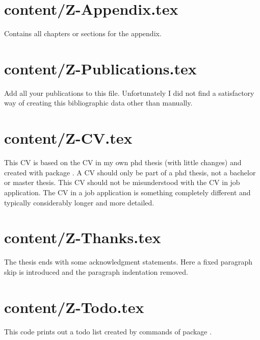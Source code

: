 \section{content/Z-Appendix.tex}

Contains all chapters or sections for the appendix.


\section{content/Z-Publications.tex}

Add all your publications to this file. Unfortunately I did not find a satisfactory way of creating this bibliographic data other than manually.


\section{content/Z-CV.tex}

This CV is based on the CV in my own phd thesis (with little changes) and created with package . A CV should only be part of a phd thesis, not a bachelor or master thesis. This CV should not be misunderstood with the CV in job application. The CV in a job application is something completely different and typically considerably longer and more detailed.


\section{content/Z-Thanks.tex}

The thesis ends with some acknowledgment statements. Here a fixed paragraph skip is introduced and the paragraph indentation removed.


\section{content/Z-Todo.tex}

This code prints out a todo list created by commands of package .

